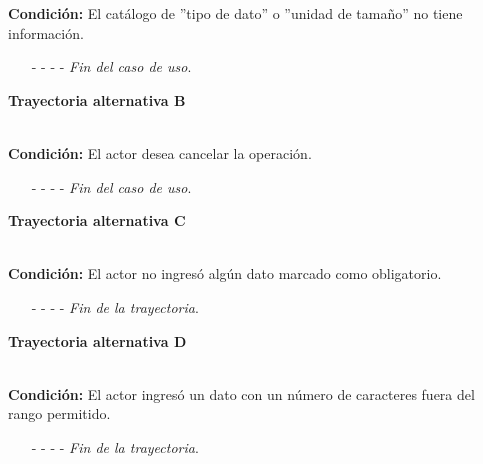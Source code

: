 \noindent \textbf{Condición:} El catálogo de ''tipo de dato'' o ''unidad de tamaño'' no tiene información.
\begin{enumerate}
	\UCpaso[\UCsist] Muestra el mensaje  en la pantalla  para indicar que no es posible realizar la operación debido a la falta de información necesaria para el sistema.
	\item[- -] - - {\em {Fin del caso de uso}}.%
\end{enumerate}
\hypertarget{CU7-1-1-1:TAB}{\textbf{Trayectoria alternativa B}}\\
\noindent \textbf{Condición:} El actor desea cancelar la operación.
\begin{enumerate}
	\UCpaso[\UCactor] Solicita cancelar la operación oprimiendo el botón  de la pantalla 
	\UCpaso[\UCsist] Muestra la pantalla .
	\item[- -] - - {\em {Fin del caso de uso}}.%
\end{enumerate}
\hypertarget{CU7-1-1-1:TAC}{\textbf{Trayectoria alternativa C}}\\
\noindent \textbf{Condición:} El actor no ingresó algún dato marcado como obligatorio.
\begin{enumerate}
	\UCpaso[\UCsist] Muestra el mensaje  señalando el campo que presenta el error en la pantalla .
	\UCpaso Regresa al paso \ref{CU7.1.1-P3} de la trayectoria principal.
	\item[- -] - - {\em {Fin de la trayectoria}}.%
\end{enumerate}
\hypertarget{CU7-1-1-1:TAD}{\textbf{Trayectoria alternativa D}}\\
\noindent \textbf{Condición:} El actor ingresó un dato con un número de caracteres fuera del rango permitido.
\begin{enumerate}
	\UCpaso[\UCsist] Muestra el mensaje  señalando el campo que presenta el error en la pantalla .
	\UCpaso Regresa al paso \ref{CU7.1.1-P3} de la trayectoria principal.
	\item[- -] - - {\em {Fin de la trayectoria}}.%
\end{enumerate}
